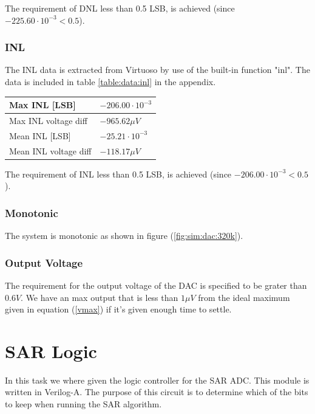 \documentclass[english, 12pt, a4paper]{ifimaster}
\begin{document}
\hfill \break
\noindent 
The requirement of DNL less than 0.5 LSB, is achieved (since \(-225.60 \cdot 10^{-3}  < 0.5 \)).
 

\subsubsection{INL}
The INL data is extracted from Virtuoso by use of the built-in function "inl". 
The data is included in table \ref{table:data:inl} in the appendix.

\begin{tabular}[t]{|l|l|}
 \hline 
  
Max INL [LSB] & \(-206.00 \cdot 10^{-3} \) \\ \hline
Max INL voltage diff & \(-965.62 \mu V \) \\ \hline

Mean INL [LSB] & \(-25.21 \cdot 10^{-3} \) \\ \hline
Mean INL voltage diff & \( -118.17 \mu V \) \\ \hline
\end{tabular}

\hfill \break
\noindent 
The requirement of INL less than 0.5 LSB, is achieved (since \(-206.00 \cdot 10^{-3}  < 0.5 \)).

\subsubsection{Monotonic}
The system is monotonic as shown in figure (\ref{fig:sim:dac:320k}).


\subsubsection{Output Voltage}
The requirement for the output voltage of the DAC is specified to be grater than \(0.6 V\). 
We have an max output that is less than \(1\mu V\) from the ideal maximum given in equation (\ref{vmax}) if it's given enough time to settle.





\section{SAR Logic}
In this task we where given the logic controller for the SAR ADC. This module is written in Verilog-A. 
The purpose of this circuit is to determine which of the bits to keep when running the SAR algorithm.
\end{document}
